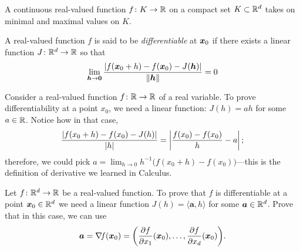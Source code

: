 \begin{theorem}\label{theorem:EVT}
A continuous real-valued function $f \colon K \to \mathbb{R}$ on a compact set $K \subset \mathbb{R}^d$ takes on minimal and maximal values on $K$.
\end{theorem}

A real-valued function $f$ is said to be \emph{differentiable} at $\boldsymbol{x}_0$ if there exists a linear function $J\colon \mathbb{R}^d \to \mathbb{R}$ so that 
\begin{equation*}
\lim_{\boldsymbol{h} \to \boldsymbol{0}} \frac{\lvert f(\boldsymbol{x}_0+h)-f(\boldsymbol{x}_0)-J(\boldsymbol{h}) \rvert}{\lVert \boldsymbol{h} \rVert} = 0
\end{equation*}

\begin{example}\label{example:derivatives}
Consider a real-valued function $f\colon \mathbb{R} \to \mathbb{R}$ of a real variable. To prove differentiability at a point $x_0$, we need a linear function: $J(h)=ah$ for some $a\in \mathbb{R}$. Notice how in that case, 
\begin{equation*}
\frac{\lvert f(x_0+h)-f(x_0)-J(h) \rvert}{\lvert h \rvert} = \left\lvert \frac{f(x_0)-f(x_0)}{h} - a \right\lvert;
\end{equation*}
therefore, we could pick $a = \lim_{h\to 0} h^{-1}\big( f(x_0+h) - f(x_0) \big)$---this is the definition of derivative we learned in Calculus.
\end{example}

\begin{problem}\label{problem:gradient}
Let $f\colon \mathbb{R}^d \to \mathbb{R}$ be a real-valued function.  To prove that $f$ is differentiable at a point $\boldsymbol{x}_0 \in \mathbb{R}^d$ we need a linear function $J(h) = \langle \boldsymbol{a}, h \rangle$ for some $\boldsymbol{a} \in \mathbb{R}^d$.  Prove that in this case, we can use
\begin{equation*}
\boldsymbol{a} = \mathop{\nabla\! {f}}(\boldsymbol{x}_0)= \bigg( \frac{\partial f}{\partial x_1}(\boldsymbol{x}_0), \dotsc, \frac{\partial f}{\partial x_d}(\boldsymbol{x}_0) \bigg).
\end{equation*}
\end{problem}


